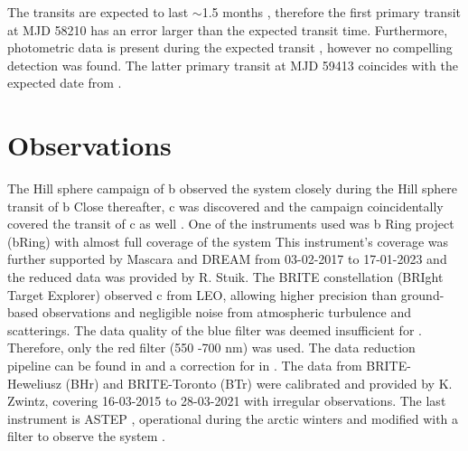 %
The transits are expected to last $\sim$1.5 months \citep{Vandal_2020}, therefore the first primary transit at MJD 58210 has an error larger than the expected transit time. 
%
Furthermore, photometric data is present during the expected transit \citep{Zwintz_2019}, however no compelling detection was found. 
%
The latter primary transit at MJD 59413 coincides with the expected date from \citet{Vandal_2020}.
%




\section{Observations}\label{sec:Observations}


The Hill sphere campaign of \pic b \citep{Kenworthy_2021} observed the \pic system closely during the Hill sphere transit of \pic b 
%
Close thereafter, \pic c was discovered and the campaign coincidentally covered the transit of \pic c as well \citep{Stuik_2017}. 
%
One of the instruments used was \pic b Ring project (bRing) with almost full coverage of the system \citep{Snellen_2012,Snellen_2013,Stuik_2014, Stuik_2016,Talens_2017, Talens_2018}
%
This instrument's coverage was further supported by Mascara and DREAM from 03-02-2017 to 17-01-2023 and the reduced data was provided by R. Stuik.
%
The BRITE constellation (BRIght Target Explorer) \citep{Weiss_2014} observed \pic c from LEO, allowing higher precision than ground-based observations and negligible noise from atmospheric turbulence and scatterings.  
%
The data quality of the blue filter was deemed insufficient \citep{Zwintz_2019} for \pic. 
%
Therefore, only the red filter (550 -700 nm) was used. The data reduction pipeline can be found in \citet{Popowic_2017} and a correction for \pic in \citet{Zwintz_2019}. 
%
The data from BRITE-Heweliusz (BHr) and BRITE-Toronto (BTr) were calibrated and provided by K. Zwintz, covering  16-03-2015 to 28-03-2021 with irregular observations. 
%
The last instrument is ASTEP  \citep{Crouzet_2010}, operational during the arctic winters and modified with a filter to observe the \pic system \cite{Kenworthy_2021}. 

